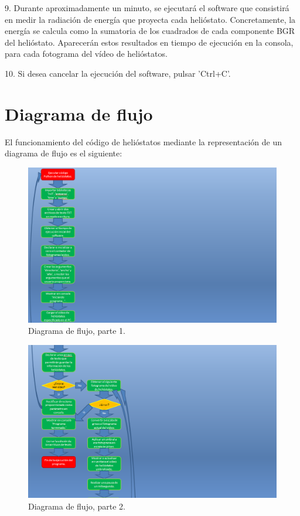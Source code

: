 9. Durante aproximadamente un minuto, se ejecutará el software que consistirá en medir la radiación de energía que proyecta cada helióstato. Concretamente, la energía se calcula como la sumatoria de los cuadrados de cada componente BGR del helióstato. Aparecerán estos resultados en tiempo de ejecución en la consola, para cada fotograma del vídeo de helióstatos.

10. Si desea cancelar la ejecución del software, pulsar 'Ctrl+C'.

\section{Diagrama de flujo}

El funcionamiento del código de helióstatos mediante la representación de un diagrama de flujo es el siguiente:

\begin{figure}[h!]
  	\centering
	\includegraphics[width=\textwidth]{DiagramaFlujoSoftwareTFG/diagramaFlujo1.PNG}
	\caption{Diagrama de flujo, parte 1.
	\label{fig:DiagramaFlujoSoftwareTFG/diagramaFlujo1.PNG}}
\end{figure}

\begin{figure}[h!]
  	\centering
	\includegraphics[width=\textwidth]{DiagramaFlujoSoftwareTFG/diagramaFlujo2.PNG}
	\caption{Diagrama de flujo, parte 2.
	\label{fig:DiagramaFlujoSoftwareTFG/diagramaFlujo2.PNG}}
\end{figure}

